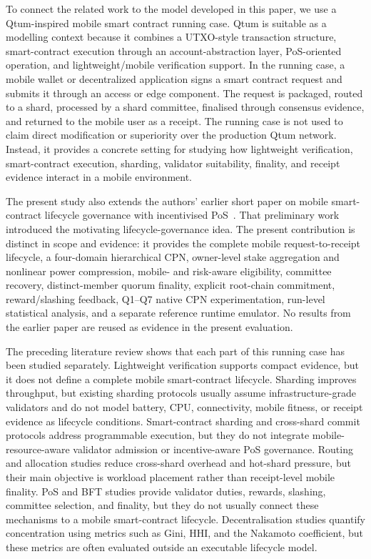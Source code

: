 \documentclass[a4paper,fleqn]{cas-sc}
\begin{document}
To connect the related work to the model developed in this paper, we use a Qtum-inspired mobile smart contract running case. Qtum is suitable as a modelling context because it combines a UTXO-style transaction structure, smart-contract execution through an account-abstraction layer, PoS-oriented operation, and lightweight/mobile verification support. In the running case, a mobile wallet or decentralized application signs a smart contract request and submits it through an access or edge component. The request is packaged, routed to a shard, processed by a shard committee, finalised through consensus evidence, and returned to the mobile user as a receipt. The running case is not used to claim direct modification or superiority over the production Qtum network. Instead, it provides a concrete setting for studying how lightweight verification, smart-contract execution, sharding, validator suitability, finality, and receipt evidence interact in a mobile environment.

The present study also extends the authors' earlier short paper on mobile
smart-contract lifecycle governance with incentivised PoS~\cite{deval2019}.
That preliminary work introduced the motivating lifecycle-governance idea.
The present contribution is distinct in scope and evidence: it provides the complete
mobile request-to-receipt lifecycle, a four-domain hierarchical CPN, owner-level
stake aggregation and nonlinear power compression, mobile- and risk-aware eligibility,
committee recovery, distinct-member quorum finality, explicit root-chain commitment,
reward/slashing feedback, Q1--Q7 native CPN experimentation, run-level statistical
analysis, and a separate reference runtime emulator. No results from the earlier paper
are reused as evidence in the present evaluation.

The preceding literature review shows that each part of this running case has been studied separately. Lightweight verification supports compact evidence, but it does not define a complete mobile smart-contract lifecycle. Sharding improves throughput, but existing sharding protocols usually assume infrastructure-grade validators and do not model battery, CPU, connectivity, mobile fitness, or receipt evidence as lifecycle conditions. Smart-contract sharding and cross-shard commit protocols address programmable execution, but they do not integrate mobile-resource-aware validator admission or incentive-aware PoS governance. Routing and allocation studies reduce cross-shard overhead and hot-shard pressure, but their main objective is workload placement rather than receipt-level mobile finality. PoS and BFT studies provide validator duties, rewards, slashing, committee selection, and finality, but they do not usually connect these mechanisms to a mobile smart-contract lifecycle. Decentralisation studies quantify concentration using metrics such as Gini, HHI, and the Nakamoto coefficient, but these metrics are often evaluated outside an executable lifecycle model.
\end{document}

